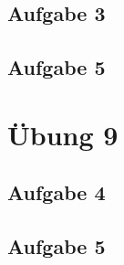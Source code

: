 \documentclass[a4paper,12pt,twoside]{article}
\theoremstyle{definition}
\begin{document}
\subsection{Aufgabe 3}

\subsection{Aufgabe 5}


\newpage
\section{Übung 9}
\subsection{Aufgabe 4}

\subsection{Aufgabe 5}

\end{document}
